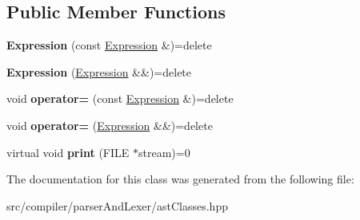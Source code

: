 \subsection*{Public Member Functions}
\begin{DoxyCompactItemize}
\item 
{\bfseries Expression} (const \hyperlink{classslang__AST__NODES_1_1Expression}{Expression} \&)=delete\hypertarget{classslang__AST__NODES_1_1Expression_a972d3fc6060baa19e37584a3ae5c5014}{}\label{classslang__AST__NODES_1_1Expression_a972d3fc6060baa19e37584a3ae5c5014}

\item 
{\bfseries Expression} (\hyperlink{classslang__AST__NODES_1_1Expression}{Expression} \&\&)=delete\hypertarget{classslang__AST__NODES_1_1Expression_afe4f99a0bf933a442d9a50eb0473345d}{}\label{classslang__AST__NODES_1_1Expression_afe4f99a0bf933a442d9a50eb0473345d}

\item 
void {\bfseries operator=} (const \hyperlink{classslang__AST__NODES_1_1Expression}{Expression} \&)=delete\hypertarget{classslang__AST__NODES_1_1Expression_ac8cbdc46f4947ff17daf3e50ae15780d}{}\label{classslang__AST__NODES_1_1Expression_ac8cbdc46f4947ff17daf3e50ae15780d}

\item 
void {\bfseries operator=} (\hyperlink{classslang__AST__NODES_1_1Expression}{Expression} \&\&)=delete\hypertarget{classslang__AST__NODES_1_1Expression_a4a8542aab7b4f00673dc922e7cd17bcc}{}\label{classslang__AST__NODES_1_1Expression_a4a8542aab7b4f00673dc922e7cd17bcc}

\item 
virtual void {\bfseries print} (F\+I\+LE $\ast$stream)=0\hypertarget{classslang__AST__NODES_1_1Expression_a1e7354a0f66c6096a787fbed0cc98537}{}\label{classslang__AST__NODES_1_1Expression_a1e7354a0f66c6096a787fbed0cc98537}

\end{DoxyCompactItemize}


The documentation for this class was generated from the following file\+:\begin{DoxyCompactItemize}
\item 
src/compiler/parser\+And\+Lexer/ast\+Classes.\+hpp\end{DoxyCompactItemize}
